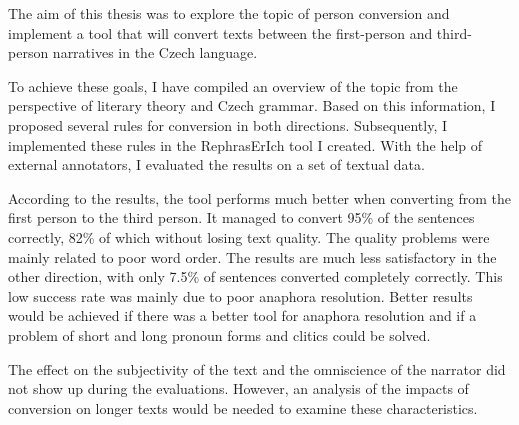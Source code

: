 The aim of this thesis was to explore the topic of person conversion and implement a tool that will convert texts between the first-person and third-person narratives in the Czech language.

To achieve these goals, I have compiled an overview of the topic from the perspective of literary theory and Czech grammar. Based on this information, I proposed several rules for conversion in both directions. Subsequently, I implemented these rules in the RephrasErIch tool I created. With the help of external annotators, I evaluated the results on a set of textual data.

According to the results, the tool performs much better when converting from the first person to the third person. It managed to convert 95\% of the sentences correctly, 82\% of which without losing text quality. The quality problems were mainly related to poor word order. The results are much less satisfactory in the other direction, with only 7.5\% of sentences converted completely correctly. This low success rate was mainly due to poor anaphora resolution. Better results would be achieved if there was a better tool for anaphora resolution and if a problem of short and long pronoun forms and clitics could be solved.

The effect on the subjectivity of the text and the omniscience of the narrator did not show up during the evaluations. However, an analysis of the impacts of conversion on longer texts would be needed to examine these characteristics.
